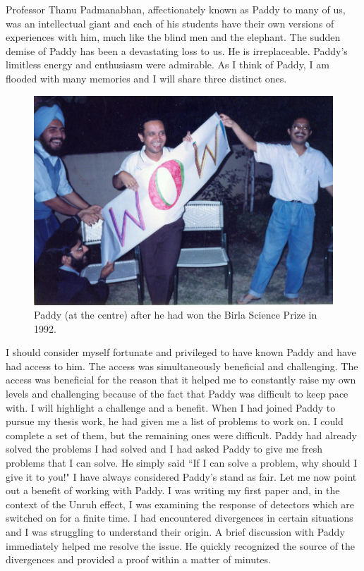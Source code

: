 \documentclass[prd, preprint, longbibliography, 12pt]{revtex4-2}
\begin{document}
\noindent Professor Thanu Padmanabhan, affectionately known as Paddy to many of us,
was an intellectual giant and each of his students have their own versions 
of experiences with him, much like the blind men and the elephant. 
The sudden demise of Paddy has been a devastating loss to us. 
He is irreplaceable.
Paddy's limitless energy and enthusiasm were admirable. 
As I think of Paddy, I am flooded with many memories and I will share three 
distinct ones.
\begin{figure}[!h]
\centering
\includegraphics[width=12.00cm]{paddy-wow.jpg}
\caption*{Paddy (at the centre) after he had won the Birla Science Prize in 1992.} 
\end{figure}

I should consider myself fortunate and privileged to have known Paddy and 
have had access to him. 
The access was simultaneously beneficial and challenging. 
The access was beneficial for the reason that it helped me to constantly 
raise my own levels and challenging because of the fact that Paddy was 
difficult to keep pace with.
I will highlight a challenge and a benefit. 
When I had joined Paddy to pursue my thesis work, he had given me a list of 
problems to work on. 
I could complete a set of them, but the remaining ones were difficult. 
Paddy had already solved the problems I had solved and I had asked Paddy to
give me fresh problems that I can solve. 
He simply said ``If I can solve a problem, why should I give it to you!" 
I have always considered Paddy's stand as fair.  
Let me now point out a benefit of working with Paddy. 
I was writing my first paper and, in the context of the Unruh effect, I was
examining the response of detectors which are switched on for a finite time. 
I had encountered divergences in certain situations and I was struggling to 
understand their origin. 
A brief discussion with Paddy immediately helped me resolve the issue. 
He quickly recognized the source of the divergences and provided a proof
within a matter of minutes. 
\end{document}
